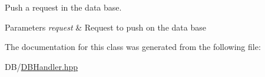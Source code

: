 Push a request in the data base. 


\begin{DoxyParams}{Parameters}
{\em request} & Request to push on the data base \\
\hline
\end{DoxyParams}


The documentation for this class was generated from the following file\+:\begin{DoxyCompactItemize}
\item 
D\+B/\hyperlink{_d_b_handler_8hpp}{D\+B\+Handler.\+hpp}\end{DoxyCompactItemize}

